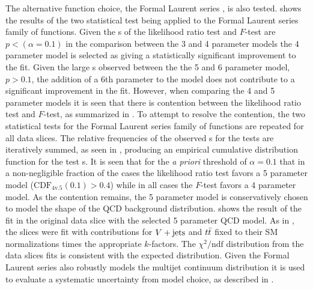 The alternative function choice, the Formal Laurent series , is also tested.
 shows the results of the two statistical test being applied to the Formal Laurent series family of functions.
Given the \pvalue{}s of the likelihood ratio test and $F$-test are $p < \left(\alpha=0.1\right)$ in the comparison between the 3 and 4 parameter models the 4 parameter model is selected as giving a statistically significant improvement to the fit.
Given the large \pvalue{}s observed between the the 5 and 6 parameter model, $p > 0.1$, the addition of a 6th parameter to the model does not contribute to a significant improvement in the fit.
However, when comparing the 4 and 5 parameter models it is seen that there is contention between the likelihood ratio test and $F$-test, as summarized in .
To attempt to resolve the contention, the two statistical tests for the Formal Laurent series family of functions are repeated for all \CRQCD{} data slices.
The relative frequencies of the observed \pvalue{}s for the tests are iteratively summed, as seen in , producing an empirical cumulative distribution function for the test \pvalue{}s.
It is seen that for the \emph{a priori} threshold of $\alpha=0.1$ that in a non-negligible fraction of the cases the likelihood ratio test favors a 5 parameter model ($\textrm{CDF}_{4\textrm{v.}5}\left(0.1\right) > 0.4$) while in all cases the $F$-test favors a 4 parameter model.
As the contention remains, the 5 parameter model is conservatively chosen to model the shape of the QCD background distribution.
 shows the result of the fit in the original data slice with the selected 5 parameter QCD model.
As in , the \CRQCD{} slices were fit with contributions for $V + \text{jets}$ and $t\bar{t}$ fixed to their SM normalizations times the appropriate $k$-factors.
The $\chi^2/\mathrm{ndf}$ distribution from the data slices fits is consistent with the expected distribution.
Given the Formal Laurent series also robustly models the multijet continuum distribution it is used to evaluate a systematic uncertainty from model choice, as described in .


